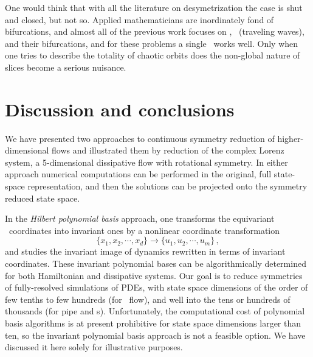 \documentclass[preprint,number,sort&compress]{elsarticle}
\begin{document}
One would think that with all the literature on
desymetrization the case is shut and closed, but not so.
Applied mathematicians are inordinately fond of bifurcations,
and almost all of the previous work focuses on \eqva, \reqva\
(traveling waves), and their bifurcations, and for these
problems a single \slice\ works well. Only when one tries to
describe the totality of chaotic orbits does the non-global
nature of slices become a serious nuisance.

\section{\label{sec:concl} Discussion and conclusions}

We have presented two approaches to continuous symmetry
reduction of higher-dimensional flows and illustrated them
by reduction of the complex Lorenz system, a 5-dimensional
dissipative flow with rotational symmetry.
In either approach numerical computations can be performed in
the original, full state-space representation, and then the
solutions can be projected onto the symmetry reduced state
space.

In the {\em Hilbert polynomial basis} approach, one transforms
the equi\-vari\-ant \statesp\ coordinates into in\-vari\-ant ones by
a nonlinear coordinate transformation
\[
\{x_1,x_2,\cdots,x_d\} \to \{u_1,u_2,\cdots,u_m\}
\,,
\]
and studies the in\-vari\-ant image of dynamics rewritten in
terms of in\-vari\-ant coordinates. These in\-vari\-ant polynomial
bases can be algorithmically determined for both Hamiltonian
and dissipative systems. Our goal is to reduce symmetries of
fully-resolved simulations of PDEs, with state space
dimensions of the order of few tenths to few hundreds (for
\KS\ flow), and well into the tens or hundreds of thousands (for pipe
and \pCf s). Unfortunately, the computational cost of
polynomial basis algorithms is at present prohibitive for
state space dimensions larger than ten, so the in\-vari\-ant
polynomial basis approach is not a feasible option. We have
discussed it here solely for illustrative purposes.
\end{document}
